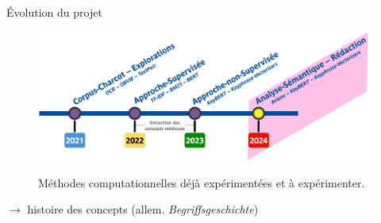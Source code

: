 \begin{frame}{Évolution du projet}
\begin{figure}[h]
    \centering
    \includegraphics[width=1\textwidth]{pic/timeline_Charcot.png}
    \label{fig:enter-label}
    \caption{Méthodes computationnelles déjà expérimentées et à expérimenter.}
\end{figure}
$\rightarrow$ histoire des concepts {\footnotesize(allem. \textit{Begriffsgeschichte}) \citep{koselleck2011introduction}}
\end{frame}